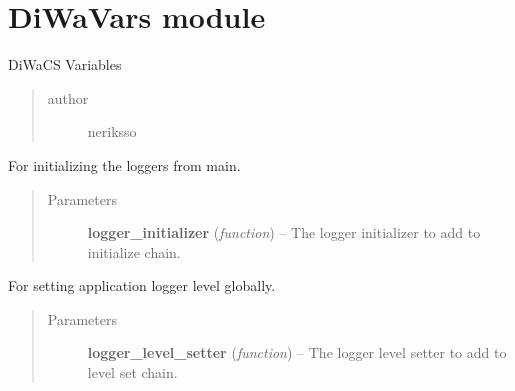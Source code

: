 \documentclass[letterpaper,10pt,english]{sphinxmanual}
\begin{document}
\section{DiWaVars module}
\label{diwavars:module-diwavars}\label{diwavars:diwavars-module}\label{diwavars::doc}
DiWaCS Variables
\begin{quote}\begin{description}
\item[{author}] \leavevmode
neriksso

\end{description}\end{quote}

\begin{fulllineitems}
\label{diwavars:diwavars.add_logger_initializer}
For initializing the loggers from main.
\begin{quote}\begin{description}
\item[{Parameters}] \leavevmode
\textbf{logger\_initializer} (\emph{function}) -- The logger initializer to add to initialize chain.

\end{description}\end{quote}

\end{fulllineitems}


\begin{fulllineitems}
\label{diwavars:diwavars.add_logger_level_setter}
For setting application logger level globally.
\begin{quote}\begin{description}
\item[{Parameters}] \leavevmode
\textbf{logger\_level\_setter} (\emph{function}) -- The logger level setter to add to level set chain.

\end{description}\end{quote}

\end{fulllineitems}

\end{document}
